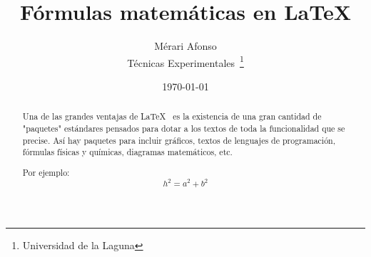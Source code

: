 \documentclass[a4paper,12pt]{article}
\begin{document}
\title{Fórmulas matemáticas en LaTeX}
\author{Mérari Afonso \\
        Técnicas Experimentales~\footnote{Universidad de la Laguna}
        }
\date{\today}
\maketitle
\begin{abstract}
  Una de las grandes ventajas de \LaTeX{}~\cite{Lam:86} es la 
  existencia de una gran cantidad de "paquetes" estándares pensados 
  para dotar a los textos de toda la funcionalidad que se precise. 
  Así hay paquetes para incluir gráficos, textos de lenguajes de programación,
  fórmulas físicas y químicas, diagramas matemáticos, etc.
  
  Por ejemplo:  \[h^2=a^2 + b^2 \]
\end{abstract}
\end{document}
